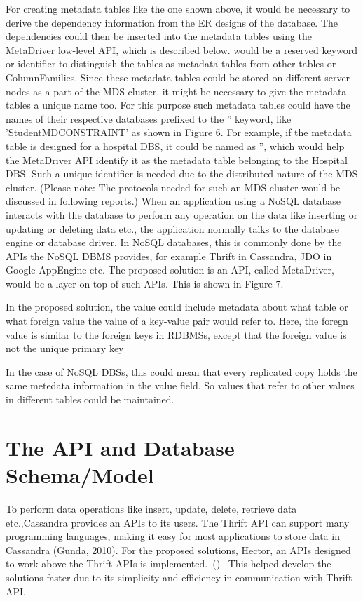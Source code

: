 For creating metadata tables like the one shown above, it would be necessary to
derive the dependency information from the ER designs of the database. The
dependencies could then be inserted into the metadata tables using the
MetaDriver low-level API, which is described below.
 would be a reserved keyword or identifier to distinguish the
tables as metadata tables from other tables or ColumnFamilies. Since these
metadata tables could be stored on different server nodes as a part of the MDS
cluster, it might be necessary to give the metadata tables a unique name too.
For this purpose such metadata tables could have the names of their respective
databases prefixed to the '' keyword, like 'StudentMDCONSTRAINT'
as shown in Figure 6. For example, if the metadata table is designed for a
hospital DBS, it could be named as '', which would help
the MetaDriver API identify it as the metadata table belonging to the Hospital
DBS. Such a unique identifier is needed due to the distributed nature of the MDS
cluster. (Please note: The protocols needed for such an MDS cluster would be
discussed in following reports.) When an application using a NoSQL database
interacts with the database to perform any operation on the data like inserting
or updating or deleting data etc., the application normally talks to the
database engine or database driver. In NoSQL databases, this is commonly done by
the APIs the NoSQL DBMS provides, for example Thrift in Cassandra, JDO in Google
AppEngine etc. The proposed solution is an API, called MetaDriver, would be a
layer on top of such APIs. This is shown in Figure 7.

In the proposed solution, the value could include metadata about what table or
what foreign value the value of a key-value pair would refer to. Here, the
foregn value is similar to the foreign keys in RDBMSs, except that the foreign
value is not the unique primary key

In the case of NoSQL DBSs, this could mean that every replicated copy holds the
same metedata information in the value field. So values that refer to other
values in different tables could be maintained.

\section{The API and Database Schema/Model}\label{s:api}

To perform data operations like insert, update, delete, retrieve data
etc.,Cassandra provides an \acp{API} to its users. The Thrift API can support
many programming languages, making it easy for most applications to store data in
Cassandra (Gunda, 2010). For the proposed solutions, Hector, an \acp{API}
designed to work above the Thrift \acp{API} is implemented.--()-- This helped develop the solutions faster due to its simplicity and
efficiency in communication with Thrift \ac{API}.

